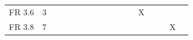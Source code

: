 \documentclass[a4paper,12pt]{article}
\begin{document}
\begin{table}[]
{\begin{tabular}{|l|c|c|c|c|c|c|c|c|c|c|c|c|c|c|c|c|}
FR 3.6 & 3                             &                             &                             &                             &                             &                             &                             &                             &                             &                             &                             & X                           &                             &                             &                             &                             \\
FR 3.8 & 7                             &                             &                             &                             &                             &                             &                             &                             &                             &                             &                             &                             &                             &                             & X                           &                            
\end{tabular}%
}
\end{table}
\end{document}
